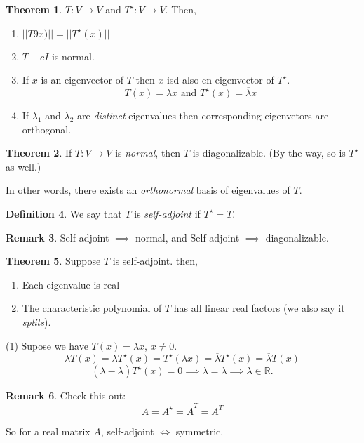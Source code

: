 \documentclass[a5paper]{article}
\makeatletter
\renewenvironment{proof}{{\bfseries Proof}}{\qed}
\renewenvironment{proof}[1][\bfseries \proofname]{\par
  \pushQED{\qed}%
  \normalfont \topsep6\p@\@plus6\p@\relax
  \trivlist
  \item[\hskip\labelsep
        \scshape
    #1\@addpunct{}]\ignorespaces
}{%
  \popQED\endtrivlist\@endpefalse
}
\theoremstyle{definition}%
\newtheorem{theorem}{Theorem}
\numberwithin{theorem}{section} %
\newtheorem{definition}[theorem]{Definition}
\newtheorem{remark}[theorem]{Remark}
\newcommand{\R}{\mathbb{R}}
\newcommand*\conj[1]{\overline{#1}}
\makeatother
\begin{document}
\pagebreak
\begin{theorem}
$T:V \to V$ and $T^\star : V \to V$. Then, 
\begin{enumerate}
\item $||T9x)||=||T^\star(x)||$
\item $T-cI$ is normal.
\item If $x$ is an eigenvector of $T$ then $x$ isd also en eigenvector of $T^\star$. 
$$T(x)=\lambda x \text{ and } T^\star(x)=\conj{\lambda} x$$
\item If $\lambda_1$ and $\lambda_2$ are \emph{distinct} eigenvalues then corresponding eigenvetors are orthogonal.
\end{enumerate}
\end{theorem}

\begin{theorem}
If $T:V \to V$ is \emph{normal}, then $T$ is diagonalizable. (By the way, so is $T^\star$ as well.)

In other words, there exists an \emph{orthonormal} basis of eigenvalues of $T$. 
\end{theorem}

\begin{definition}
We say that $T$ is \emph{self-adjoint} if $T^\star=T$.
\begin{remark} Self-adjoint $\implies$ normal, and Self-adjoint $\implies$ diagonalizable.
\end{remark}
\end{definition}

\begin{theorem}
Suppose $T$ is self-adjoint. then, 
\begin{enumerate}
\item Each eigenvalue is real
\item The characteristic polynomial of $T$ has all linear real factors (we also say it \emph{splits}).
\end{enumerate}
\begin{proof}
(1) Supose we have $T(x)=\lambda x$, $x \neq 0$.
$$\lambda T(x) = \lambda T^\star(x) = T^\star(\lambda x) = \conj{\lambda}T^\star(x) = \conj{\lambda}T(x)$$
$$(\lambda	- \conj{\lambda})T^\star(x) = 0 \implies \lambda= \conj{\lambda} \implies \lambda \in \R.$$
\end{proof}
\end{theorem}

\begin{remark}
Check this out:
$$A=A^\star=\conj{A}^T=A^T$$

So for a real matrix $A$, self-adjoint $\iff$ symmetric.
\end{remark}
\end{document}
